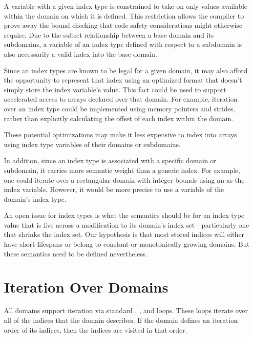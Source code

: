 A variable with a given index type is constrained to take on only values
available within the domain on which it is defined.  This restriction allows the
compiler to prove away the bound checking that code safety considerations might
otherwise require.  Due to the subset relationship between a base domain and its
subdomains, a variable of an index type defined with respect to a subdomain is
also necessarily a valid index into the base domain.

Since an index types are known to be legal for a given domain, it may
also afford the opportunity to represent that index using an optimized
format that doesn't simply store the index variable's value.  This fact could be
used to support accelerated access to arrays declared over that domain.  For
example, iteration over an index type could be implemented using memory pointers
and strides, rather than explicitly calculating the offset of each index
within the domain.

These potential optimizations may make it less expensive to
index into arrays using index type variables of their domains or
subdomains.

In addition, since an index type is associated with a specific domain or subdomain, it
carries more semantic weight than a generic index.  For example, one could
iterate over a rectangular domain with integer bounds using an  as
the index variable.  However, it would be more precise to use a variable of the
domain's index type.

\begin{openissue}

An open issue for index types is what the semantics should be for an
index type value that is live across a modification to its domain's
index set---particularly one that shrinks the index set.  Our
hypothesis is that most stored indices will either have short
lifespans or belong to constant or monotonically growing domains.  But
these semantics need to be defined nevertheless.

\end{openissue}

\section{Iteration Over Domains}
\label{Iteration_over_Domains}

All domains support iteration via standard , , and 
loops.  These loops iterate over all of the indices that the domain
describes.  If the domain defines an iteration order of its indices,
then the indices are visited in that order.  

